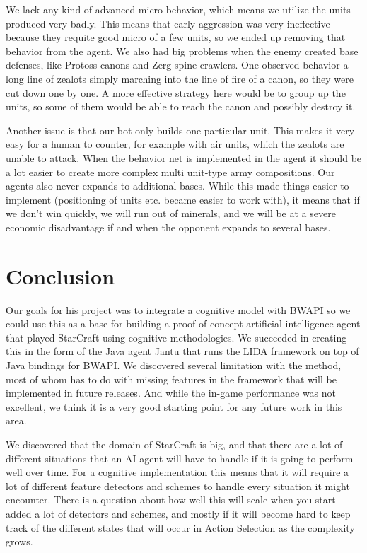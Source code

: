 We lack any kind of advanced micro behavior, which means we utilize the units produced very badly. This means that early aggression was very ineffective because they requite good micro of a few units, so we ended up removing that behavior from the agent. We also had big problems when the enemy created base defenses, like Protoss canons and Zerg spine crawlers. One observed behavior a long line of zealots simply marching into the line of fire of a canon, so they were cut down one by one. A more effective strategy here would be to group up the units, so some of them would be able to reach the canon and possibly destroy it.

Another issue is that our bot only builds one particular unit. This makes it very easy for a human to counter, for example with air units, which the zealots are unable to attack. When the behavior net is implemented in the agent it should be a lot easier to create more complex multi unit-type army compositions.
Our agents also never expands to additional bases. While this made things easier to implement (positioning of units etc. became easier to work with), it means that if we don't win quickly, we will run out of minerals, and we will be at a severe economic disadvantage if and when the opponent expands to several bases.

\section{Conclusion}
\label{sec:conclusion}
Our goals for his project was to integrate a cognitive model with BWAPI so we could use this as a base for building a proof of concept artificial intelligence agent that played StarCraft using cognitive methodologies.
We succeeded in creating this in the form of the Java agent Jantu that runs the LIDA framework on top of Java bindings for BWAPI. We discovered several limitation with the method, most of whom has to do with missing features in the framework that will be implemented in future releases. And while the in-game performance was not excellent, we think it is a very good starting point for any future work in this area.

We discovered that the domain of StarCraft is big, and that there are a lot of different situations that an AI agent will have to handle if it is going to perform well over time. For a cognitive implementation this means that it will require a lot of different feature detectors and schemes to handle every situation it might encounter. There is a question about how well this will scale when you start added a lot of detectors and schemes, and mostly if it will become hard to keep track of the different states that will occur in Action Selection as the complexity grows.

